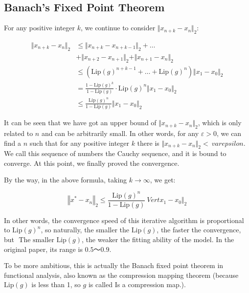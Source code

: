 \documentclass[final]{cvpr}
\begin{document}
\begin {appendix}
\section{Banach's Fixed Point Theorem}
\label{app3}
For any positive integer $k$, we continue to consider $\Vert x_{n+k}-x_{n}\Vert_2$:

\begin{equation}\begin{aligned}\Vert x_{n+k}-x_{n}\Vert_2&\leq\Vert x_{n+k}-x_{n+k-1}\Vert_2+\dots\\&+\Vert x_{n+2}-x_{n+1}\Vert_2+\Vert x_{n+1}-x_{n}\Vert_2\\
&\leq \left(\text{Lip}(g)^{n+k-1}+\dots +\text{Lip}(g)^{ n}\right)\Vert x_{1}-x_{0}\Vert_2\\
& = \frac{1-\text{Lip}(g)^k}{1-\text{Lip}(g)}\cdot\text{Lip}(g)^{n}\Vert x_{1} -x_{0}\Vert_2\\
& \leq \frac{\text{Lip}(g)^n}{1-\text{Lip}(g)}\Vert x_{1}-x_{0}\Vert_2
\end{aligned}\end{equation}

It can be seen that we have got an upper bound of $\Vert x_{n+k}-x_{n}\Vert_2$, which is only related to $n$ and can be arbitrarily small. In other words, for any $\varepsilon> 0$, we can find a $n$ such that for any positive integer $k$ there is $\Vert x_{n+k}-x_{n}\Vert_2 <\ varepsilon$. We call this sequence of numbers the Cauchy sequence, and it is bound to converge. At this point, we finally proved the convergence.

By the way, in the above formula, taking $k\to\infty$, we get:

\begin{equation}\left\Vert x^*-x_{n}\right\Vert_2 \leq \frac{\text{Lip}(g)^n}{1-\text{Lip}(g)}\ Vert x_{1}-x_{0}\Vert_2\end{equation}

In other words, the convergence speed of this iterative algorithm is proportional to $\text{Lip}(g)^n$, so naturally, the smaller the $\text{Lip}(g)$, the faster the convergence, but $\text{ The smaller Lip}(g)$, the weaker the fitting ability of the model. In the original paper, its range is $0.5～0.9$.

To be more ambitious, this is actually the Banach fixed point theorem in functional analysis, also known as the compression mapping theorem (because $\text{Lip}(g)$ is less than 1, so $g$ is called Is a compression map.).

\end {appendix}
\end{document}
